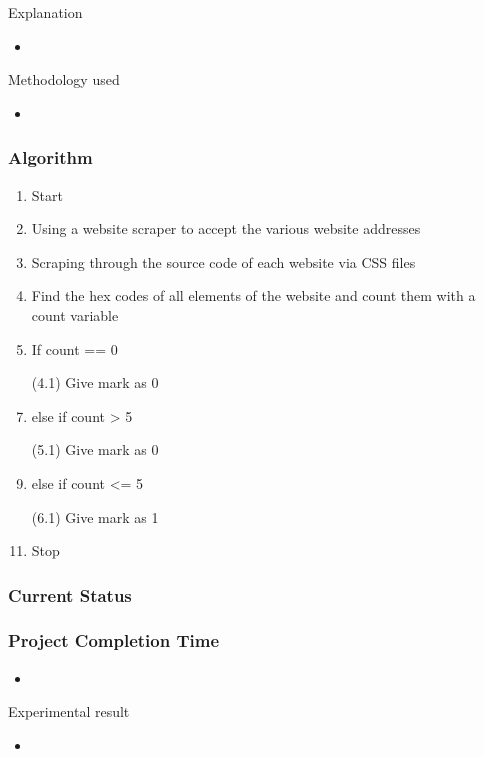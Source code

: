 \documentclass[11pt]{beamer}
\begin{document}
	\begin{frame}{Explanation }
		\begin{itemize}
			\item 
		\end{itemize}
	\end{frame}
		\begin{frame}{Methodology used }
	\begin{itemize}
		\item 
	\end{itemize}
	\end{frame}
	\begin{frame}
	\frametitle{{Algorithm}}
	\begin{enumerate}
	\item Start
	\item Using a website scraper to accept the various website addresses
	\item Scraping through the source code of each website via CSS files
	\item Find the hex codes of all elements of the website and count them with a count variable
	\item If count == 0
	\item [(4.1)] Give mark as 0
	\item else if count > 5
	\item [(5.1)] Give mark as 0
	\item else if count <= 5
	\item [(6.1)] Give mark as 1
	\item Stop
	\end{enumerate}
	
	\end{frame}
	\begin{frame}
	\frametitle{{Current Status}}
		\begin{figure}
		
	\end{figure}
	\end{frame}
\begin{frame}
			\frametitle{{Project Completion Time}}
	\begin{itemize}
		\item
	\end{itemize}
\end{frame}

\begin{frame}{Experimental result}
			\begin{itemize}
				\item
			\end{itemize}	
	\end{frame}
\end{document}
